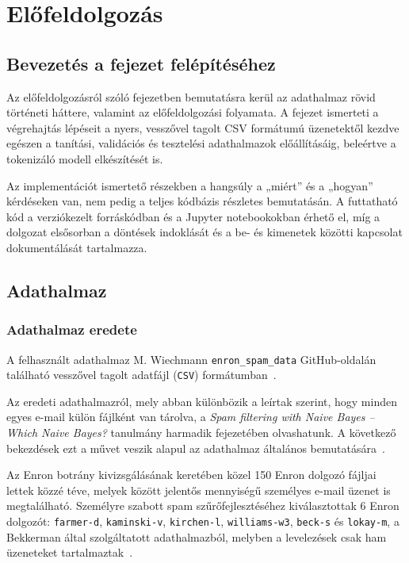 \chapter{Előfeldolgozás}

\section{Bevezetés a fejezet felépítéséhez}

Az előfeldolgozásról szóló fejezetben bemutatásra kerül az adathalmaz rövid történeti háttere, valamint az előfeldolgozási folyamata. 
A fejezet ismerteti a végrehajtás lépéseit a nyers, vesszővel tagolt CSV formátumú üzenetektől kezdve egészen a tanítási, 
validációs és tesztelési adathalmazok előállításáig, beleértve a tokenizáló modell elkészítését is.

Az implementációt ismertető részekben a hangsúly a „miért” és a „hogyan” kérdéseken van, nem pedig a teljes kódbázis részletes bemutatásán. 
A futtatható kód a verziókezelt forráskódban és a Jupyter notebookokban érhető el, míg a dolgozat elsősorban a döntések indoklását és a 
be- és kimenetek közötti kapcsolat dokumentálását tartalmazza.

\section{Adathalmaz}

\subsection{Adathalmaz eredete}

A felhasznált adathalmaz M. Wiechmann \texttt{enron\_spam\_data} GitHub-oldalán található vesszővel tagolt adatfájl
(\texttt{CSV}) formátumban~\cite{wiechmannNoppelEnronSpam}.

Az eredeti adathalmazról, mely abban különbözik a leírtak szerint, hogy minden egyes e-mail külön fájlként van tárolva,
a \emph{Spam filtering with Naive Bayes -- Which Naive Bayes?} tanulmány harmadik fejezetében olvashatunk.
A következő bekezdések ezt a művet veszik alapul az adathalmaz általános bemutatására~\cite{inproceedings}.

Az Enron botrány kivizsgálásának keretében közel 150 Enron dolgozó fájljai lettek közzé téve,
melyek között jelentős mennyiségű személyes e-mail üzenet is megtalálható.
Személyre szabott spam szűrőfejlesztéséhez kiválasztottak 6 Enron dolgozót:
\texttt{farmer-d}, \texttt{kaminski-v}, \texttt{kirchen-l}, \texttt{williams-w3}, \texttt{beck-s} és \texttt{lokay-m},
a Bekkerman által szolgáltatott adathalmazból, melyben a levelezések csak ham üzeneteket tartalmaztak~\cite{inproceedings}.

